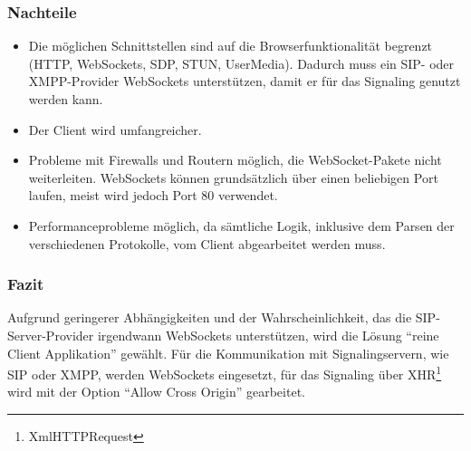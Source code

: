 		\subsubsection{Nachteile}
		\begin{itemize}
			\item Die möglichen Schnittstellen sind auf die Browserfunktionalität
			begrenzt (HTTP, WebSockets, SDP, STUN, UserMedia). Dadurch
			muss ein SIP- oder XMPP-Provider WebSockets unterstützen, damit er für das
			Signaling genutzt werden kann.
			\item Der Client wird umfangreicher.
			\item Probleme mit Firewalls und Routern möglich, die WebSocket-Pakete nicht
			weiterleiten. WebSockets können grundsätzlich über einen beliebigen Port laufen, meist wird jedoch Port 80 verwendet.
			\item Performanceprobleme möglich, da sämtliche Logik, inklusive dem Parsen
			der verschiedenen Protokolle, vom Client abgearbeitet werden muss.
		\end{itemize}

		\subsubsection{Fazit}
			Aufgrund geringerer Abhängigkeiten und der Wahrscheinlichkeit, das die
			SIP-Server-Provider irgendwann WebSockets unterstützen, wird die Lösung
			"`reine Client Applikation"' gewählt.
			Für die Kommunikation mit Signalingservern, wie SIP oder XMPP, werden
			WebSockets eingesetzt, für das Signaling über XHR\footnote{XmlHTTPRequest}
			wird mit der Option "`Allow Cross Origin"' gearbeitet.